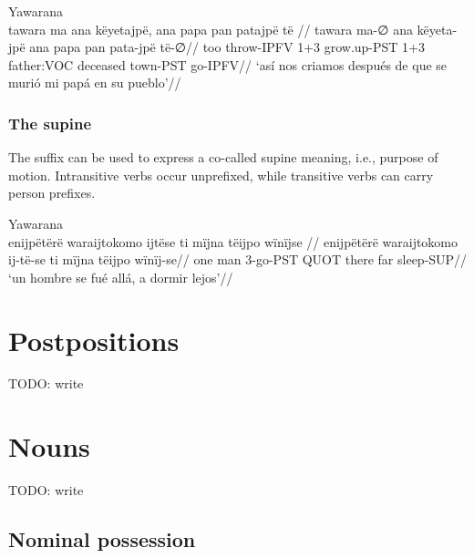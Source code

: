 \documentclass{article}
\begin{document}
 Yawarana \\
\begingl
\glpreamble  tawara ma ana këyetajpë, ana papa pan patajpë të //
\gla tawara ma-∅ ana këyeta-jpë ana papa pan pata-jpë të-∅//
\glb too throw-IPFV 1+3 grow.up-PST 1+3 father:VOC deceased town-PST go-IPFV//
\glft ‘así nos criamos después de que se murió mi papá en su pueblo’//  
\endgl 
\xe

\subsubsection{The supine}

The suffix  can be used to express a co-called supine meaning,
i.e., purpose of motion. Intransitive verbs occur unprefixed, while
transitive verbs can carry person prefixes.

 Yawarana \\
\begingl
\glpreamble  enijpëtërë waraijtokomo ijtëse ti mïjna tëijpo wïnïjse //
\gla enijpëtërë waraijtokomo ij-të-se ti mïjna tëijpo wïnïj-se//
\glb one man 3-go-PST QUOT there far sleep-SUP//
\glft ‘un hombre se fué allá, a dormir lejos’//  
\endgl 
\xe

\section{Postpositions}

TODO: write

\section{Nouns}

TODO: write

\subsection{Nominal possession}

\printbibliography

% 
% 
% 
% 
% 
% 
% 
% 
% 
\end{document}
